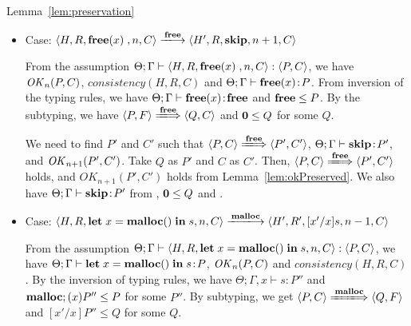 \begin{pfof}{Lemma~\ref{lem:preservation}}
\begin{itemize}
   we need to find \(P'\) and \(C'\) s.t. \( \Theta; \Gamma \vdash
  \SKIP:P'\), \( OK_n(P', C')\), \( \langle P, C \rangle
  \Longrightarrow P', C' \rangle \) and \(consistency(H, R,
  C')\). Taking \( Q \) as \( P'\) and \(C\) as \(C'\), then \(
  \langle P, C \rangle \rightarrow \langle P', C' \rangle\) holds, and
  then \( OK_n(P', C')\) and \(consistency(H, R, C')\) hold from
  Lemma~\ref{lem:okPreserved} and Lemma~\ref{lem:consistency} . From
  ,  and \( 0 \le Q\), then \( \Theta; \Gamma
  \vdash \SKIP:P'\) holds.

\item Case: \(\langle H, R, \FREE, n, C\rangle \xlongrightarrow{\Free}
  \langle H', R, \SKIP, n + 1, C \rangle \)

  From the assumption \( \Theta; \Gamma \vdash \langle H, R, \mathbf{free}(x)\;, n,
  C \rangle : \langle P, C \rangle\), we have \(\mathit{OK}_n(P, C)\),
  \(consistency(H, R, C)\) and \(\Theta; \Gamma \vdash \mathbf{free}(x) \!:\! P\).
  From inversion of the typing rules, we have \(\Theta; \Gamma \vdash
  \mathbf{free}(x) \!:\! \mathbf{free}\) and \(\mathbf{free} \le P\). By the subtyping, we have
  \( \langle P, F \rangle \xLongrightarrow{\Free} \langle Q, C
  \rangle\) and \(\mathbf{0} \le Q \) for some \(Q\).

  We need to find \(P'\) and \(C'\) such that \( \langle P, C \rangle
  \xLongrightarrow{\Free} \langle P', C' \rangle \), \(\Theta; \Gamma
  \vdash \mathbf{skip} \!:\! P'\), and \(\mathit{OK}_{n+1}(P', C')\).  Take \(Q\) as
  \(P'\) and \(C\) as \(C'\).  Then, \( \langle P, C \rangle
  \xLongrightarrow{\Free} \langle P', C' \rangle \) holds, and
  \(OK_{n+1}(P', C')\) holds from Lemma~\ref{lem:okPreserved}.  We
  also have \(\Theta; \Gamma \vdash \mathbf{skip} \!:\! P'\) from ,
  \(\mathbf{0} \le Q\) and .

\item Case: \( \langle H, R, \LET x = \MALLOC \IN s, n, C\rangle
  \xlongrightarrow{\Malloc} \langle H', R', [x'/x]s, n - 1, C \rangle \)

  From the assumption \( \Theta; \Gamma \vdash \langle H, R, \mathbf{let}\; x =
  \mathbf{malloc()}\; \mathbf{in}\; s, n, C \rangle : \langle P, C \rangle\), we have
  \(\Theta; \Gamma \vdash \mathbf{let}\; x = \mathbf{malloc()}\; \mathbf{in}\; s \!:\! P\),
  \(\mathit{OK}_{n}(P, C)\) and \(consistency(H, R, C)\). By the inversion of
  typing rules, we have \(\Theta; \Gamma, x \vdash s : P'' \) and \(
  \mathbf{malloc}; (x)P'' \le P \) for some \(P''\). By subtyping, we get \(
  \langle P, C \rangle \xLongrightarrow{\Malloc} \langle Q, F \rangle
  \) and \( [x'/x]P'' \le Q\) for some \(Q\).


\end{itemize}
\end{pfof}
